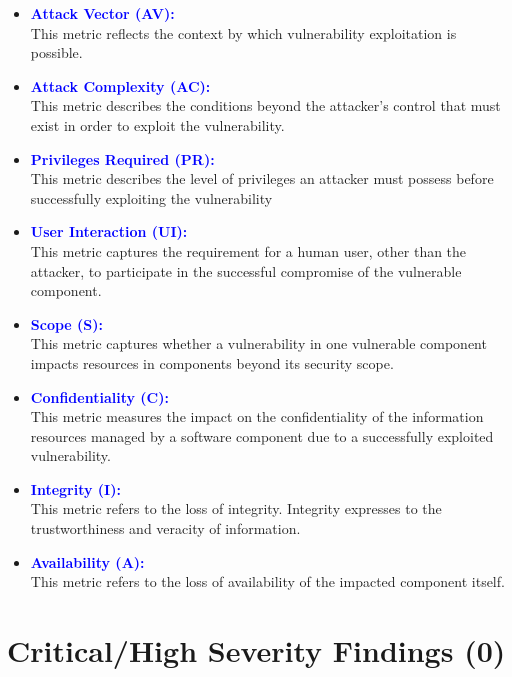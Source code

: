 \documentclass{article}
\begin{document}
\begin{itemize}
	\item \textbf{\textcolor{blue}{Attack Vector (AV):}} \\ This metric reflects the context by which vulnerability exploitation is possible.
	\item \textbf{\textcolor{blue}{Attack Complexity (AC):}} \\ This metric describes the conditions beyond the attacker's control that must exist in order to exploit the vulnerability.
	\item \textbf{\textcolor{blue}{Privileges Required (PR):}} \\ This metric describes the level of privileges an attacker must possess before successfully exploiting the vulnerability
	\item \textbf{\textcolor{blue}{User Interaction (UI):}} \\ This metric captures the requirement for a human user, other than the attacker, to participate in the successful compromise of the vulnerable component.
	\item \textbf{\textcolor{blue}{Scope (S):}} \\ This metric captures whether a vulnerability in one vulnerable component impacts resources in components beyond its security scope.
	\item \textbf{\textcolor{blue}{Confidentiality (C):}} \\ This metric measures the impact on the confidentiality of the information resources managed by a software component due to a successfully exploited vulnerability.
	\item \textbf{\textcolor{blue}{Integrity (I):}} \\ This metric refers to the loss of integrity. Integrity expresses to the trustworthiness and veracity of information.
	\item \textbf{\textcolor{blue}{Availability (A):}} \\ This metric refers to the loss of availability of the impacted component itself.
\end{itemize}
\newpage
\section{Critical/High Severity Findings (0)}

\newpage
\end{document}
